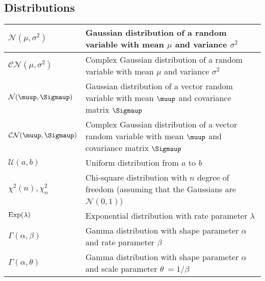 \documentclass{article}
\begin{document}
\subsection{Distributions}
\begin{xltabular}{\textwidth}{XX}
	\(\mathcal{N}(\mu, \sigma^2)\)                                & Gaussian distribution of a random variable with mean \(\mu\) and variance \(\sigma^{2}\)                                                                           \\ \hline
	\(\mathcal{CN}(\mu, \sigma^2)\)                               & Complex Gaussian distribution of a random variable with mean \(\mu\) and variance \(\sigma^{2}\)                                                                   \\ \hline
	\(\mathcal{N}(\boldsymbol{\muup}, \boldsymbol{\Sigmaup})\)    & Gaussian distribution of a vector random variable with mean \(\boldsymbol{\muup}\) and covariance matrix \(\boldsymbol{\Sigmaup}\)                                 \\ \hline
	\(\mathcal{CN}(\boldsymbol{\muup}, \boldsymbol{\Sigmaup})\)   & Complex Gaussian distribution of a vector random variable with mean \(\boldsymbol{\muup}\) and covariance matrix \(\boldsymbol{\Sigmaup}\)                         \\ \hline
	\(\mathcal{U}(a,b)\)                                          & Uniform distribution from \(a\) to \(b\)                                                                                                                           \\ \hline
	\(\chi^2 (n), \chi^2_n\)                                      & Chi-square distribution with \(n\) degree of freedom (assuming that the Gaussians are \(\mathcal{N}(0,1)\))                                                        \\ \hline
	\(\textnormal{Exp}(\lambda)\)                                 & Exponential distribution with rate parameter \(\lambda\)                                                                                                           \\ \hline
	\(\Gamma(\alpha, \beta)\)                                     & Gamma distribution with shape parameter \(\alpha\) and rate parameter \(\beta\)                                                                                    \\ \hline
	\(\Gamma(\alpha, \theta)\)                                    & Gamma distribution with shape parameter \(\alpha\) and scale parameter \(\theta\ = 1/\beta\)                                                                       \\ \hline

\end{xltabular}
\end{document}
